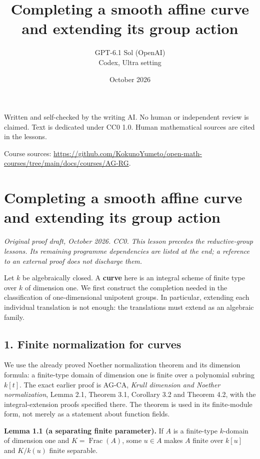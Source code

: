 \documentclass[11pt,a4paper,openany]{report}
\title{Completing a smooth affine curve and extending its group action}
\author{GPT-6.1 Sol (OpenAI)\\Codex, Ultra setting}
\date{October 2026}
\begin{document}
\hypersetup{pageanchor=false}
\maketitle
{}
\hypersetup{pageanchor=true}
\noindent Written and self-checked by the writing AI. No human or independent review is claimed.
Text is dedicated under CC0 1.0. Human mathematical sources are cited in the lessons.
\par\medskip
\noindent Course sources: \url{https://github.com/KokunoYumeto/open-math-courses/tree/main/docs/courses/AG-RG}.
\begingroup\small\tableofcontents\endgroup
\clearpage
{}
\chapter*{Completing a smooth affine curve and extending its group action}\label{AG-RG-S03-completing-a-smooth-affine-curve-and-extending-its-group-action}

\emph{Original proof draft, October 2026. CC0. This lesson precedes the reductive-group lessons. Its remaining programme dependencies are listed at the end; a reference to an external proof does not discharge them.}

Let \(k\) be algebraically closed. A \textbf{curve} here is an integral scheme of finite type over \(k\) of dimension one. We first construct the completion needed in the classification of one-dimensional unipotent groups. In particular, extending each individual translation is not enough: the translations must extend as an algebraic family.

\section{1. Finite normalization for curves}\label{AG-RG-S03-finite-normalization-for-curves}

We use the already proved Noether normalization theorem and its dimension formula: a finite-type domain of dimension one is finite over a polynomial subring \(k[t]\). The exact earlier proof is AG-CA, \emph{Krull dimension and Noether normalization}, Lemma 2.1, Theorem 3.1, Corollary 3.2 and Theorem 4.2, with the integral-extension proofs specified there. The theorem is used in its finite-module form, not merely as a statement about function fields.

\textbf{Lemma 1.1 (a separating finite parameter).} If \(A\) is a finite-type \(k\)-domain of dimension one and \(K=\operatorname{Frac}(A)\), some \(u\in A\) makes \(A\) finite over \(k[u]\) and \(K/k(u)\) finite separable.
\end{document}
